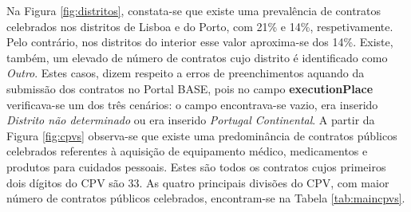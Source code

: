 



\begin{table}[H]
	\centering
	\renewcommand{\arraystretch}{1.35}
	\setlength{\tabcolsep}{20pt}
	\caption{Descrição das principais divisões de CPV.}
	\label{tab:maincpvs}
\end{table}

Na Figura \ref{fig:distritos}, constata-se que existe uma prevalência de contratos celebrados nos distritos de Lisboa e do Porto, com 21\% e 14\%, respetivamente. Pelo contrário, nos distritos do interior esse valor aproxima-se dos 14\%. Existe, também, um elevado de número de contratos cujo distrito é identificado como \textit{Outro}. Estes casos, dizem respeito a erros de preenchimentos aquando da submissão dos contratos no Portal BASE, pois no campo \textbf{executionPlace} verificava-se um dos três cenários: o campo encontrava-se vazio, era inserido \textit{Distrito não determinado} ou era inserido \textit{Portugal Continental}. A partir da Figura \ref{fig:cpvs} observa-se que existe uma predominância de contratos públicos celebrados referentes à aquisição de equipamento médico, medicamentos e produtos para cuidados pessoais. Estes são todos os contratos cujos primeiros dois dígitos do CPV são 33. As quatro principais divisões do CPV, com maior número de contratos públicos celebrados, encontram-se na Tabela \ref{tab:maincpvs}. 

